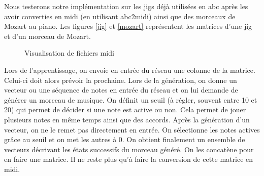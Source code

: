 Nous testerons notre implémentation sur les jigs déjà utilisées en abc après les avoir converties en midi (en utilisant abc2midi) ainsi que des morceaux de Mozart au piano. Les figures \ref{jig} et \ref{mozart} représentent les matrices d'une jig et d'un morceau de Mozart.

\begin{figure}[!h]
  \centering
  \hfill
  \caption{Visualisation de fichiers midi}
\end{figure}

Lors de l'apprentissage, on envoie en entrée du réseau une colonne de la matrice. Celui-ci doit alors prévoir la prochaine. Lors de la génération, on donne un vecteur ou une séquence de notes en entrée du réseau et on lui demande de générer un morceau de musique. On définit un seuil (à régler, souvent entre 10 et 20) qui permet de décider si une note est active ou non. Cela permet de jouer plusieurs notes en même temps ainsi que des accords. Après la génération d'un vecteur, on ne le remet pas directement en entrée. On sélectionne les notes actives grâce au seuil et on met les autres à 0. On obtient finalement un ensemble de vecteurs décrivant les états successifs du morceau généré. On les concatène pour en faire une matrice. Il ne reste plus qu'à faire la conversion de cette matrice en midi.


